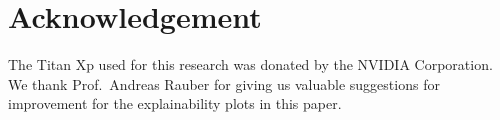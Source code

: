 \documentclass[10pt,sigconf,letterpaper,dvipsnames]{acmart}
\begin{document}

\section*{Acknowledgement}
The Titan Xp used for this research was donated by the NVIDIA Corporation. We thank Prof.~Andreas Rauber for giving us valuable suggestions for improvement for the explainability plots in this paper. 



%




%
%
\end{document}
